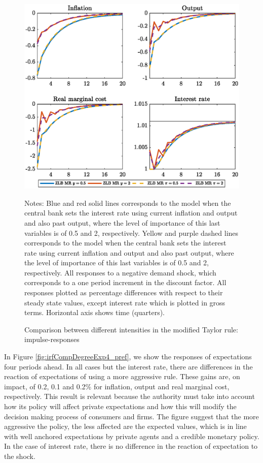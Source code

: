 \documentclass[11pt]{article}
\numberwithin{equation}{section}
\begin{document}
\begin{figure}[H]
	\centering
	\caption{Comparison between different intensities in the modified Taylor rule: impulse-responses}\label{fig:irfCompDegreeLevel_pref}
	\includegraphics[scale=.6]{irfCompDegreeLevel_pref}
	\begin{minipage}{\linewidth}
    	\vspace{1mm}
	\footnotesize{{\sc Notes:} Blue and red solid lines corresponds to the model when the central bank sets the interest rate using current inflation and output and also past output, where the level of importance of this last variables is of 0.5 and 2, respectively. Yellow and purple dashed lines corresponds to the model when the central bank sets the interest rate using current inflation and output and also past output, where the level of importance of this last variables is of 0.5 and 2, respectively. All responses to a negative demand shock, which corresponds to a one period increment in the discount factor. All responses plotted as percentage differences with respect to their steady state values, except interest rate which is plotted in gross terms. Horizontal axis shows time (quarters).}
	\end{minipage}
\end{figure}

In Figure \ref{fig:irfCompDegreeExp4_pref}, we show the responses of expectations four periods ahead. In all cases but the interest rate, there are differences in the reaction of expectations of using a more aggressive rule. These gains are, on impact, of 0.2, 0.1 and 0.2\% for inflation, output and real marginal cost, respectively. This result is relevant because the authority must take into account how its policy will affect private expectations and how this will modify the decision making process of consumers and firms. The figure suggest that the more aggressive the policy, the less affected are the expected values, which is in line with well anchored expectations by private agents and a credible monetary policy. In the case of interest rate, there is no difference in the reaction of expectation to the shock.
\end{document}
